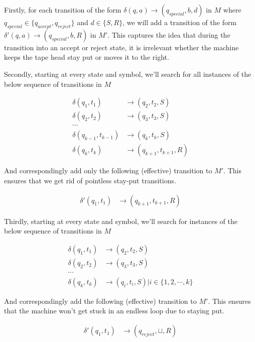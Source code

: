 \documentclass{article}
\begin{document}
Firstly, for each transition of the form $\delta(q, a) \rightarrow (q_{special}, b, d)$ in $M$ where $q_{special} \in \{q_{accept}, q_{reject}\}$ and $d \in \{S, R\}$, we will add a transition of the form $\delta'(q, a) \rightarrow (q_{special}, b, R)$ in $M'$. This captures the idea that during the transition into an accept or reject state, it is irrelevant whether the machine keeps the tape head stay put or moves it to the right.

Secondly, starting at every state and symbol, we'll search for all instances of the below sequence of transitions in $M$

\begin{align*}
    \delta(q_1, t_1)             & \rightarrow (q_2, t_2, S) \\
    \delta(q_2, t_2)             & \rightarrow (q_3, t_3, S) \\
    \cdots \\
    \delta(q_{k - 1}, t_{k - 1}) & \rightarrow (q_k, t_k, S) \\
    \delta(q_k, t_k)             & \rightarrow (q_{k + 1}, t_{k + 1}, R)
\end{align*}

And correspondingly add only the following (effective) transition to $M'$. This ensures that we get rid of pointless stay-put transitions.

\begin{align*}
    \delta'(q_1, t_1) & \rightarrow (q_{k + 1}, t_{k + 1}, R)
\end{align*}

Thirdly, starting at every state and symbol, we'll search for instances of the below sequence of transitions in $M$

\begin{align*}
    \delta(q_1, t_1)             & \rightarrow (q_2, t_2, S) \\
    \delta(q_2, t_2)             & \rightarrow (q_3, t_3, S) \\
    \cdots \\
    \delta(q_k, t_k)             & \rightarrow (q_i, t_i, S) | i \in \{1, 2, \cdots , k\}
\end{align*}

And correspondingly add the following (effective) transition to $M'$. This ensures that the machine won't get stuck in an endless loop due to staying put.

\begin{align*}
    \delta'(q_1, t_1) & \rightarrow (q_{reject}, \sqcup, R)
\end{align*}
\end{document}
